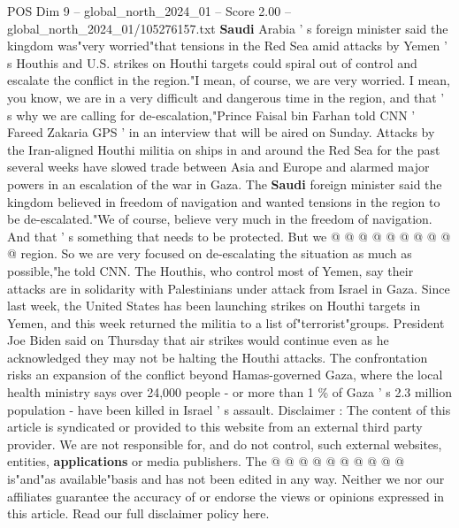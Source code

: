 \begin{textsample}{POS Dim 9 – global\_north\_2024\_01 – Score 2.00 – global\_north\_2024\_01/105276157.txt}  \label{ex:f9_pos_246}
\textbf{Saudi} Arabia ' s foreign minister said the kingdom was"very worried"that tensions in the Red Sea amid attacks by Yemen ' s Houthis and U.S. strikes on Houthi targets could spiral out of control and escalate the conflict in the region."I mean, of course, we are very worried.
I mean, you know, we are in a very difficult and dangerous time in the region, and that ' s why we are calling for de-escalation,"Prince Faisal bin Farhan told CNN ' Fareed Zakaria GPS ' in an interview that will be aired on Sunday.
Attacks by the Iran-aligned Houthi militia on ships in and around the Red Sea for the past several weeks have slowed trade between Asia and Europe and alarmed major powers in an escalation of the war in Gaza.
The \textbf{Saudi} foreign minister said the kingdom believed in freedom of navigation and wanted tensions in the region to be de-escalated."We of course, believe very much in the freedom of navigation.
And that ' s something that needs to be protected.
But we @ @ @ @ @ @ @ @ @ @ region.
So we are very focused on de-escalating the situation as much as possible,"he told CNN.
The Houthis, who control most of Yemen, say their attacks are in solidarity with Palestinians under attack from Israel in Gaza.
Since last week, the United States has been launching strikes on Houthi targets in Yemen, and this week returned the militia to a list of"terrorist"groups.
President Joe Biden said on Thursday that air strikes would continue even as he acknowledged they may not be halting the Houthi attacks.
The confrontation risks an expansion of the conflict beyond Hamas-governed Gaza, where the local health ministry says over 24,000 people - or more than 1 \% of Gaza ' s 2.3 million population - have been killed in Israel ' s assault.
Disclaimer : The content of this article is syndicated or provided to this website from an external third party provider.
We are not responsible for, and do not control, such external websites, entities, \textbf{applications} or media publishers.
The @ @ @ @ @ @ @ @ @ @ is"and"as available"basis and has not been edited in any way.
Neither we nor our affiliates guarantee the accuracy of or endorse the views or opinions expressed in this article.
Read our full disclaimer policy here.

\end{textsample}
